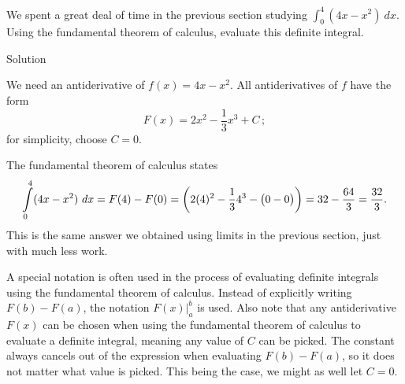 \fi


\begin{example}\label{ex_ftc3}
We spent a great deal of time in the previous section studying $\int_0^4(4x-x^2)\ dx$. Using the fundamental theorem of calculus, evaluate this definite integral. 


Solution 

We need an antiderivative of $f(x)=4x-x^2$. All antiderivatives of $f$ have the form $$F(x) = 2x^2-\frac13x^3+C\,;$$ for simplicity, choose $C=0$.

The fundamental theorem of calculus states 
		$$\displaystyle \int\limits_0^4(4x-x^2)\ dx = F(4)-F(0) = \left(2(4)^2-\frac134^3-\big(0-0\big)\right) = 32-\frac{64}3 = \dfrac{32}{3}.$$
This is the same answer we obtained using limits in the previous section, just with much less work.
\end{example}

A special notation is often used in the process of evaluating definite integrals using the fundamental theorem of calculus. Instead of explicitly writing $F(b)-F(a)$, the notation $F(x)\Big|_a^b$ is used. Also note that  any antiderivative $F(x)$ can be chosen when using the fundamental theorem of calculus to evaluate a definite integral, meaning any value of $C$ can be picked. The constant always cancels out of the expression when evaluating $F(b)-F(a)$, so it does not matter what value is picked. This being the case, we might as well let $C=0$.

